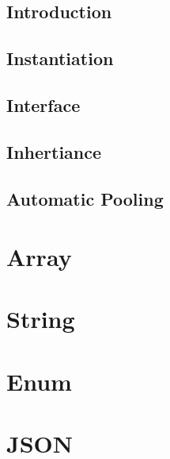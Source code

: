 \documentclass[12pt,letterpaper]{report}
\begin{document}
\subsection{Introduction}
\subsection{Instantiation}
\subsection{Interface}
\subsection{Inhertiance}
\subsection{Automatic Pooling}
\section{Array}
\section{String}
\section{Enum}
\section{JSON}
\end{document}
